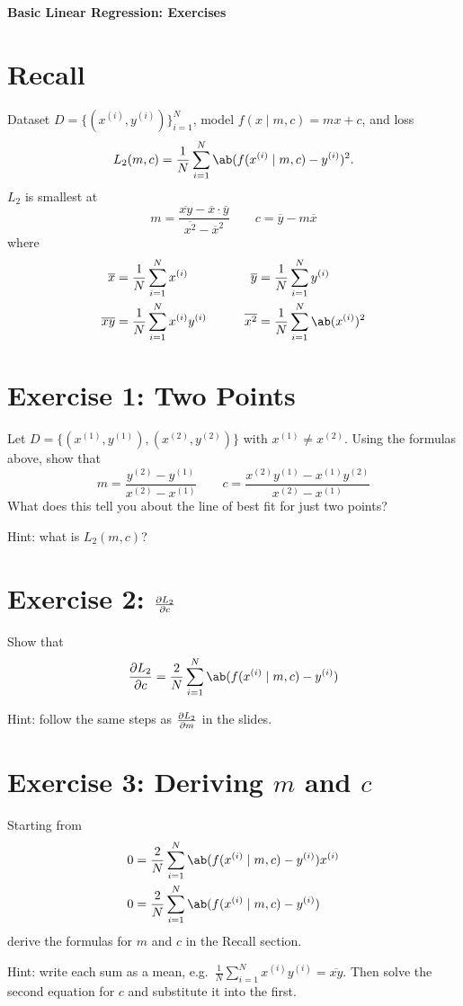 \documentclass[11pt]{article}
\begin{document}
{\centering\LARGE\bfseries Basic Linear Regression: Exercises\par}

\section*{Recall}

Dataset \(D = \{(x^{(i)}, y^{(i)})\}_{i = 1}^N\), model \(f(x\mid m, c) = mx + c\), and loss
\[L_2(m, c) = \frac{1}{N}\sum_{i = 1}^N\ab(f(x^{(i)}\mid m, c) - y^{(i)})^2.\]
\(L_2\) is smallest at
\[m = \frac{\overline{xy} - \overline{x}\cdot \overline{y}}{\overline{x^2} - \overline{x}^2} \qquad c = \overline{y} - m\overline{x}\]
where
\begin{alignat*}{2}
    \overline{x} &= \frac{1}{N}\sum_{i = 1}^Nx^{(i)} &\qquad \overline{y} &= \frac{1}{N}\sum_{i = 1}^Ny^{(i)}\\
    \overline{xy} &= \frac{1}{N}\sum_{i = 1}^Nx^{(i)}y^{(i)} &\qquad \overline{x^2} &= \frac{1}{N}\sum_{i = 1}^N\ab(x^{(i)})^2
\end{alignat*}

\section*{Exercise 1: Two Points}

Let \(D = \{(x^{(1)}, y^{(1)}), (x^{(2)}, y^{(2)})\}\) with \(x^{(1)} \neq x^{(2)}\). Using the formulas above, show that
\[m = \frac{y^{(2)} - y^{(1)}}{x^{(2)} - x^{(1)}} \qquad c = \frac{x^{(2)}y^{(1)} - x^{(1)}y^{(2)}}{x^{(2)} - x^{(1)}}\]
What does this tell you about the line of best fit for just two points?

Hint: what is \(L_2(m, c)\)?

\section*{Exercise 2: \(\pdv{L_2}{c}\)}

Show that
\[\pdv{L_2}{c} = \frac{2}{N}\sum_{i = 1}^N\ab(f(x^{(i)}\mid m, c) - y^{(i)})\]

Hint: follow the same steps as \(\pdv{L_2}{m}\) in the slides.

\section*{Exercise 3: Deriving \(m\) and \(c\)}

Starting from
\begin{align*}
    0 &= \frac{2}{N}\sum_{i = 1}^N\ab(f(x^{(i)}\mid m, c) - y^{(i)})x^{(i)}\\
    0 &= \frac{2}{N}\sum_{i = 1}^N\ab(f(x^{(i)}\mid m, c) - y^{(i)})
\end{align*}
derive the formulas for \(m\) and \(c\) in the Recall section.

Hint: write each sum as a mean, e.g.\ \(\frac{1}{N}\sum_{i = 1}^Nx^{(i)}y^{(i)} = \overline{xy}\). Then solve the second equation for \(c\) and substitute it into the first.
\end{document}
